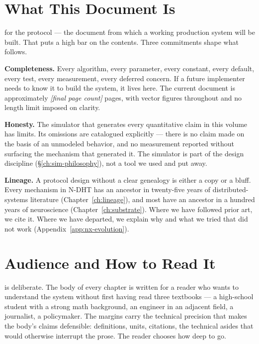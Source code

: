 \documentclass[twoside,nobib]{tufte-book}
\newcommand{\NDHT}{N-DHT\xspace}
\begin{document}
\section{What This Document Is}

 for the protocol --- the
document from which a working production system will be built.
That puts a high bar on the contents. Three commitments shape what
follows.

\textbf{Completeness.} Every algorithm, every parameter, every
constant, every default, every test, every measurement, every
deferred concern. If a future implementer needs to know it to build
the system, it lives here. The current document is approximately
\textit{[final page count]} pages, with vector figures throughout and
no length limit imposed on clarity.

\textbf{Honesty.} The simulator that generates every quantitative
claim in this volume has limits. Its omissions are catalogued
explicitly --- there is no claim made on the basis of an unmodeled
behavior, and no measurement reported without surfacing the
mechanism that generated it. The simulator is part of the design
discipline (\S\ref{ch:sim-philosophy}), not a tool we used and put
away.

\textbf{Lineage.} A protocol design without a clear genealogy is
either a copy or a bluff. Every mechanism in \NDHT has an ancestor
in twenty-five years of distributed-systems literature
(Chapter~\ref{ch:lineage}), and most have an ancestor in a hundred
years of neuroscience (Chapter~\ref{ch:substrate}). Where we have
followed prior art, we cite it. Where we have departed, we explain
why and what we tried that did not work
(Appendix~\ref{app:nx-evolution}).

\section{Audience and How to Read It}

 is deliberate. The body of every
chapter is written for a reader who wants to understand the system
without first having read three textbooks --- a high-school student
with a strong math background, an engineer in an adjacent field, a
journalist, a policymaker. The margins carry the technical
precision that makes the body's claims
defensible: definitions, units, citations, the technical asides
that would otherwise interrupt the prose. The reader chooses how
deep to go.
\end{document}
